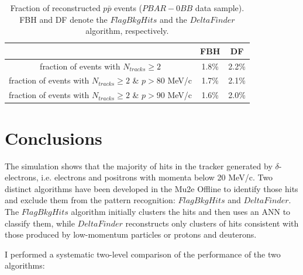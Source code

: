 \begin{center}
        \begin{table}[h!]
        \centering
        \renewcommand{\arraystretch}{1.}
        \begin{tabular}{| c | c | c |} 
            \hline
            &  FBH & DF\\
            \hline
            fraction of events with $N_{tracks} \geq 2$ &  1.8\% & 2.2\%\\
            \hline
            fraction of events with $N_{tracks} \geq 2$ \& $p>$80 MeV/c & 1.7\% & 2.1\%\\
            \hline
            fraction of events with $N_{tracks} \geq 2$ \& $p>$90 MeV/c & 1.6\% & 2.0\%\\
            \hline
            \end{tabular}
        \caption{Fraction of reconstructed $p\bar{p}$ events 
        ($PBAR-0BB$ data sample). FBH and DF denote the $FlagBkgHits$ and the $DeltaFinder$ algorithm, respectively.}
        \label{tab:recoeffpbar}
        \end{table}
\end{center}

\section{Conclusions}
The simulation shows that the majority 
of hits in the tracker 
%
generated by $\delta$-electrons, i.e. electrons 
and positrons with momenta below 20 MeV/c. 
Two distinct algorithms have been developed in the Mu2e Offline to 
identify those hits and exclude them from the pattern recognition: 
$FlagBkgHits$ and $DeltaFinder$. 
The $FlagBkgHits$ algorithm initially clusters the hits and then uses an ANN 
to classify them, while $DeltaFinder$ reconstructs only clusters of hits  
consistent with those produced by low-momentum particles or protons and deuterons.

I performed a systematic two-level comparison of the performance of the two algorithms:

